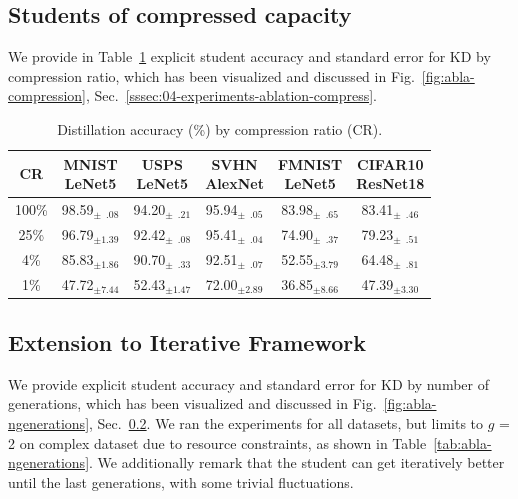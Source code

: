 \subsection{Students of compressed capacity} \label{ssec:app04-explicit-compression}
We provide in Table~\ref{tab:abla-compression} explicit student accuracy and standard error for KD by compression ratio, which has been visualized and discussed in Fig.~\ref{fig:abla-compression}, Sec.~\ref{sssec:04-experiments-ablation-compress}.

\begin{table}[ht] %
    \caption{Distillation accuracy (\%) by compression ratio (CR).}
    \centering
    \begin{tabular}{c|c|c|c|c|c}
        \hline
            {\centering \textbf{CR}}
            & \makecell{\textbf{MNIST}   \\ LeNet5}
            & \makecell{\textbf{USPS}    \\ LeNet5}
            & \makecell{\textbf{SVHN}    \\ AlexNet}
            & \makecell{\textbf{FMNIST}  \\ LeNet5}
            & \makecell{\textbf{CIFAR10} \\ ResNet18} \\
        \hline
                  100\% & 98.59$_{\pm \phantom{0}.08}$ & 94.20$_{\pm \phantom{0}.21}$ & 95.94$_{\pm \phantom{0}.05}$ & 83.98$_{\pm \phantom{0}.65}$ & 83.41$_{\pm \phantom{0}.46}$ \\
        \phantom{0}25\% &           96.79$_{\pm 1.39}$ & 92.42$_{\pm \phantom{0}.08}$ & 95.41$_{\pm \phantom{0}.04}$ & 74.90$_{\pm \phantom{0}.37}$ & 79.23$_{\pm \phantom{0}.51}$ \\
        \phantom{00}4\% &           85.83$_{\pm 1.86}$ & 90.70$_{\pm \phantom{0}.33}$ & 92.51$_{\pm \phantom{0}.07}$ &           52.55$_{\pm 3.79}$ & 64.48$_{\pm \phantom{0}.81}$ \\
        \phantom{00}1\% &           47.72$_{\pm 7.44}$ &           52.43$_{\pm 1.47}$ &           72.00$_{\pm 2.89}$ &           36.85$_{\pm 8.66}$ &           47.39$_{\pm 3.30}$ \\
        \hline
    \end{tabular}
    \label{tab:abla-compression}
\end{table}
        

\subsection{Extension to Iterative Framework} \label{ssec:app03-extension-ngenerations}
\begin{foldable}
    We provide explicit student accuracy and standard error for KD by number of generations, which has been visualized and discussed in Fig.~\ref{fig:abla-ngenerations}, Sec.~\ref{ssec:app03-extension-ngenerations}.
    We ran the experiments for all datasets, but limits to $g$ = 2 on complex dataset due to resource constraints, as shown in Table~\ref{tab:abla-ngenerations}.
    We additionally remark that the student can get iteratively better until the last generations, with some trivial fluctuations.
\end{foldable}

